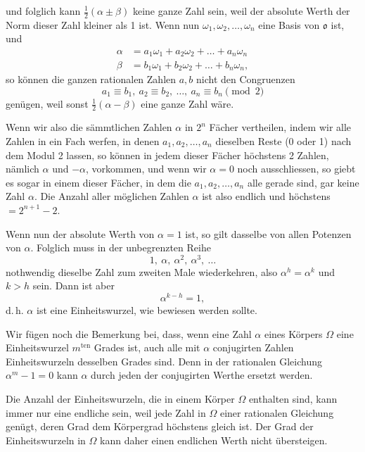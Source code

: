 und folglich kann $\frac{1}{2}(\alpha \pm \beta)$ keine ganze Zahl sein, weil der
absolute Werth der Norm dieser Zahl kleiner als 1 ist. Wenn
nun $\omega_1, \omega_2, \dots, \omega_n$ eine Basis von $\mathfrak{o}$ ist, und
\[
\begin{aligned}
\alpha &= a_1\omega_1 + a_2\omega_2 + \dots + a_n\omega_n \\
\beta &= b_1\omega_1 + b_2\omega_2 + \dots + b_n\omega_n,
\end{aligned}
\]
so können die ganzen rationalen Zahlen $a, b$ nicht den Congruenzen
\[ a_1 \equiv b_1,\ a_2 \equiv b_2,\ \dots,\ a_n \equiv b_n \pmod{2} \]
genügen, weil sonst $\frac{1}{2}(\alpha - \beta)$ eine ganze Zahl wäre.

Wenn wir also die sämmtlichen Zahlen $\alpha$ in $2^n$ Fächer vertheilen,
indem wir alle Zahlen in ein Fach werfen, in denen
$a_1, a_2, \dots, a_n$ dieselben Reste (0 oder 1) nach dem Modul 2
lassen, so können in jedem dieser Fächer höchstens 2 Zahlen,
nämlich $\alpha$ und $-\alpha$, vorkommen, und wenn wir $\alpha = 0$ noch
ausschliessen, so giebt es sogar in einem dieser Fächer, in dem
die $a_1, a_2, \dots, a_n$ alle gerade sind, gar keine Zahl $\alpha$. Die Anzahl
 aller möglichen Zahlen $\alpha$ ist also endlich und höchstens
$= 2^{n+1} - 2$.

Wenn nun der absolute Werth von $\alpha = 1$ ist, so gilt dasselbe
von allen Potenzen von $\alpha$. Folglich muss in der unbegrenzten
Reihe
\[ 1,\ \alpha,\ \alpha^2,\ \alpha^3,\ \dots \]
nothwendig dieselbe Zahl zum zweiten Male wiederkehren, also
$\alpha^h = \alpha^k$ und $k > h$ sein. Dann ist aber
\[ \alpha^{k-h} = 1, \]
d.\,h. $\alpha$ ist eine Einheitswurzel, wie bewiesen werden sollte.

Wir fügen noch die Bemerkung bei, dass, wenn eine Zahl $\alpha$
eines Körpers $\Omega$ eine Einheitswurzel $m^{\text{ten}}$ Grades ist, auch alle
mit $\alpha$ conjugirten Zahlen Einheitswurzeln desselben Grades sind.
Denn in der rationalen Gleichung $\alpha^m - 1 = 0$ kann $\alpha$ durch
jeden der conjugirten Werthe ersetzt werden.

Die Anzahl der Einheitswurzeln, die in einem Körper $\Omega$
enthalten sind, kann immer nur eine endliche sein, weil jede
Zahl in $\Omega$ einer rationalen Gleichung genügt, deren Grad dem
Körpergrad höchstens gleich ist. Der Grad der Einheitswurzeln
in $\Omega$ kann daher einen endlichen Werth nicht übersteigen.
